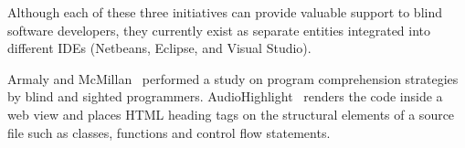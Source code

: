 Although each of these three initiatives can provide valuable support
to blind software developers, they currently exist as separate
entities integrated into different IDEs (Netbeans, Eclipse, and Visual
Studio).

Armaly and McMillan~\cite{armaly-tse18} performed a study on program
comprehension strategies by blind and sighted
programmers. AudioHighlight~\cite{armaly-icsme18} renders the code
inside a web view and places HTML heading tags on the structural
elements of a source file such as classes, functions and control flow
statements. 







